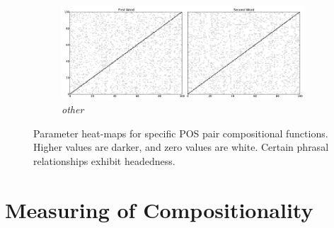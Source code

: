\documentclass[11pt,letterpaper]{article}
\newcommand{\bW}{{\bf W}}
\begin{document}
\begin{figure}[t!]
\begin{center}
\begin{subfigure}{\columnwidth}
		\centering
		\includegraphics[width=0.95\columnwidth,keepaspectratio=true]{./x_x.pdf}	
		\caption{\small \emph{other}}
		\label{fig:x_x}			
	\end{subfigure}
	\end{center}	
	\caption{Parameter heat-maps for specific POS pair compositional functions. Higher values are darker, and zero values are white. Certain phrasal relationships exhibit headedness.}
	\label{fig:heatmaps}
\end{figure}



\section{Measuring of Compositionality}
\label{sec:scoring}
\end{document}
